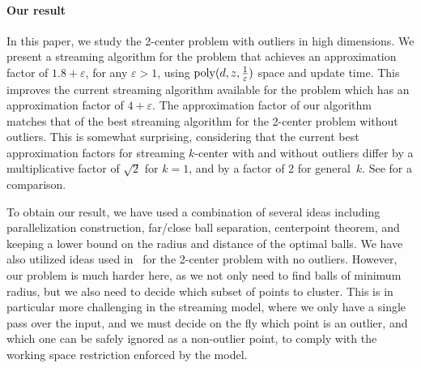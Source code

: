\documentclass[envcountsame]{cls/cccg15}
\renewcommand{\O}{\ensuremath{{O}}}
\newcommand{\poly}{\mathop{\mathrm{poly}}}
\newcommand{\eps}{\varepsilon}
\newcommand{\REM}[1]{}
\begin{document}
\paragraph{Our result}
In this paper, we study the 2-center problem with outliers in high dimensions.
We present a streaming algorithm for the problem that achieves
an approximation factor of $1.8 + \eps$, for any $\eps > 1$,
using $\poly(d, z, {1 \over \eps})$ space and update time.
This improves the current streaming algorithm available for the problem
which has an approximation factor of $4+\eps$.
The approximation factor of our algorithm matches
that of the best streaming algorithm for the 2-center problem without outliers.
This is somewhat surprising, considering that 
the current best approximation factors for streaming $k$-center with and without outliers 
differ by a multiplicative factor of $\sqrt{2}$ for $k=1$,
and by a factor of 2  for general~$k$. %
See  for a comparison.

To obtain our result, we have used a combination of several ideas
including parallelization construction, far/close ball separation, centerpoint theorem,
and keeping a lower bound on the radius and distance of the optimal balls.
We have also utilized ideas used in~\cite{kim2014improved} 
for the 2-center problem with no outliers.
However, our problem is much harder here, %
as we not only need to find balls of minimum radius, 
but we also need to decide which subset of points to cluster.
This is in particular more challenging in the streaming model,
where we only have a single pass over the input, and we must decide on the fly
which point is an outlier, 
and which one can be safely ignored as a non-outlier point,
to comply with the working space restriction enforced by the model.


\REM{
The rest of this paper is organized as follows.
In Section~\ref{sec:1-center}, we give a simple $2$-approximation algorithm for 
the 1-center problem with outliers that uses $\O(z^2 + zd)$ space.
In the next section, we show a $(1.8 + \eps)$-approximation
streaming algorithm for 2-center with $z$ outliers in high dimensions. 
}


\end{document}

